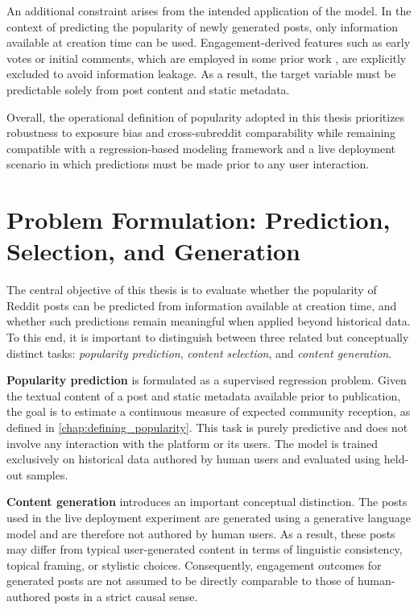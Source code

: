 An additional constraint arises from the intended application of the model. In the context of predicting the popularity of newly generated posts, only information available at creation time can be used. Engagement-derived features such as early votes or initial comments, which are employed in some prior work \cite{terentiev2014predicting,wigsnes2019predicting}, are explicitly excluded to avoid information leakage. As a result, the target variable must be predictable solely from post content and static metadata.

Overall, the operational definition of popularity adopted in this thesis prioritizes robustness to exposure bias and cross-subreddit comparability while remaining compatible with a regression-based modeling framework and a live deployment scenario in which predictions must be made prior to any user interaction.

\section{Problem Formulation: Prediction, Selection, and Generation}

The central objective of this thesis is to evaluate whether the popularity of Reddit posts can be predicted from information available at creation time, and whether such predictions remain meaningful when applied beyond historical data. To this end, it is important to distinguish between three related but conceptually distinct tasks: \emph{popularity prediction}, \emph{content selection}, and \emph{content generation}.

\textbf{Popularity prediction} is formulated as a supervised regression problem. Given the textual content of a post and static metadata available prior to publication, the goal is to estimate a continuous measure of expected community reception, as defined in \autoref{chap:defining_popularity}. This task is purely predictive and does not involve any interaction with the platform or its users. The model is trained exclusively on historical data authored by human users and evaluated using held-out samples.

\textbf{Content generation} introduces an important conceptual distinction. The posts used in the live deployment experiment are generated using a generative language model and are therefore not authored by human users. As a result, these posts may differ from typical user-generated content in terms of linguistic consistency, topical framing, or stylistic choices. Consequently, engagement outcomes for generated posts are not assumed to be directly comparable to those of human-authored posts in a strict causal sense.

